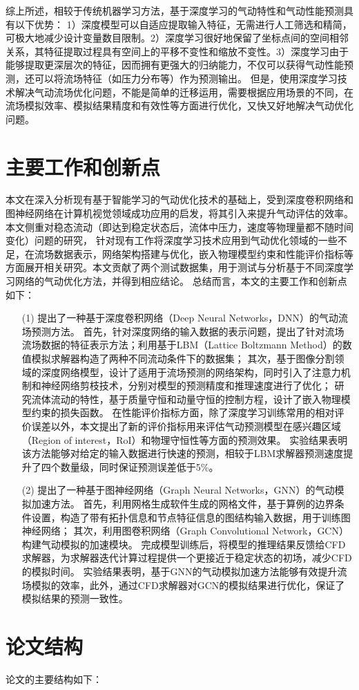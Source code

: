 综上所述，相较于传统机器学习方法，基于深度学习的气动特性和气动性能预测具有以下优势：
1）深度模型可以自适应提取输入特征，无需进行人工筛选和精简，可极大地减少设计变量数目限制。2）深度学习很好地保留了坐标点间的空间相邻关系，其特征提取过程具有空间上的平移不变性和缩放不变性。3）深度学习由于能够提取更深层次的特征，因而拥有更强大的归纳能力，不仅可以获得气动性能预测，还可以将流场特征（如压力分布等）作为预测输出。
但是，使用深度学习技术解决气动流场优化问题，不能是简单的迁移运用，需要根据应用场景的不同，在流场模拟效率、模拟结果精度和有效性等方面进行优化，又快又好地解决气动优化问题。

\section{主要工作和创新点}
本文在深入分析现有基于智能学习的气动优化技术的基础上，受到深度卷积网络和图神经网络在计算机视觉领域成功应用的启发，将其引入来提升气动评估的效率。
本文侧重对稳态流动（即达到稳定状态后，流体中压力，速度等物理量都不随时间变化）问题的研究，
针对现有工作将深度学习技术应用到气动优化领域的一些不足，在流场数据表示，网络架构搭建与优化，嵌入物理模型约束和性能评价指标等方面展开相关研究。本文贡献了两个测试数据集，用于测试与分析基于不同深度学习网络的气动优化方法，并得到相应结论。
总结而言，本文的主要工作和创新点如下：
\begin{itemize}
	\item[(1)] 提出了一种基于深度卷积网络（Deep Neural Networks，DNN）的气动流场预测方法。
	首先，针对深度网络的输入数据的表示问题，提出了针对流场流场数据的特征表示方法；利用基于LBM（Lattice Boltzmann Method）的数值模拟求解器构造了两种不同流动条件下的数据集；
	其次，基于图像分割领域的深度网络模型，设计了适用于流场预测的网络架构，同时引入了注意力机制和神经网络剪枝技术，分别对模型的预测精度和推理速度进行了优化；
	研究流体流动的特性，基于质量守恒和动量守恒的控制方程，设计了嵌入物理模型约束的损失函数。
	在性能评价指标方面，除了深度学习训练常用的相对评价误差以外，本文提出了新的评价指标用来评估气动预测模型在感兴趣区域（Region of  interest，RoI）和物理守恒性等方面的预测效果。
	实验结果表明该方法能够对给定的输入数据进行快速的预测，相较于LBM求解器预测速度提升了四个数量级，同时保证预测误差低于5\%。
		
	
	\item[(2)] 提出了一种基于图神经网络（Graph Neural  Networks，GNN）的气动模拟加速方法。
	首先，利用网格生成软件生成的网格文件，基于算例的边界条件设置，构造了带有拓扑信息和节点特征信息的图结构输入数据，用于训练图神经网络；
	其次，利用图卷积网络（Graph  Convolutional Network，GCN）构建气动模拟的加速模块。
	完成模型训练后，将模型的推理结果反馈给CFD求解器，为求解器迭代计算过程提供一个更接近于稳定状态的初场，减少CFD的模拟时间。
	实验结果表明，基于GNN的气动模拟加速方法能够有效提升流场模拟的效率，此外，通过CFD求解器对GCN的模拟结果进行优化，保证了模拟结果的预测一致性。
	
	
	
	
\end{itemize}

\section{论文结构}
论文的主要结构如下：



